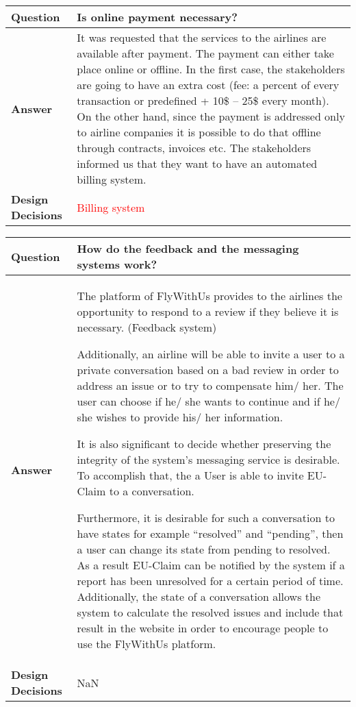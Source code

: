 \begin{longtable}{| l |  p{12cm} |}
\hline
\textbf{Question} & \textbf{Is online payment necessary?}  \\ \hline
\textbf{Answer} &
	 It was requested that the services to the airlines are available after payment. The payment can either take place online or offline. In the first case, 
	the stakeholders are going to have an extra cost (fee: a percent of every transaction or predefined + 10\$ – 25\$ every month). On the other hand, since the 
	payment is addressed only to airline companies it is possible to do that offline through contracts, invoices etc.
	The stakeholders informed us that they want to have an automated billing system. \\ \hline
\textbf{Design Decisions} & \textcolor{red}{Billing system} \\ \hline
\end{longtable}

\begin{longtable}{| l |  p{12cm} |}
\hline
\textbf{Question} & \textbf{How do the feedback and the messaging systems work?}  \\ \hline
\textbf{Answer} &
	The platform of FlyWithUs provides to the airlines the opportunity to respond to a review if they believe it is necessary. (Feedback system)\newline

	Additionally, an airline will be able to invite a user to a private conversation based on a bad review in order to address an issue or to try to compensate him/ her. The user can choose 
	if he/ she wants to continue and if he/ she wishes to provide his/ her information. \newline

	It is also significant to decide whether preserving the integrity of the system's  messaging service is desirable. To accomplish that, the a User is able to invite EU-Claim to a conversation. \newline

	Furthermore, it is desirable for such a conversation to have states for example “resolved”  and “pending”, then a user can change its state from pending to resolved. As a result 
	EU-Claim can be notified by the system if a report has been unresolved for a certain period of time.  Additionally, the state of a conversation allows the system to calculate the resolved 
	issues and include that result in the website in order to encourage people to use the FlyWithUs platform. \\ \hline
\textbf{Design Decisions} & NaN \\ \hline
\end{longtable}

